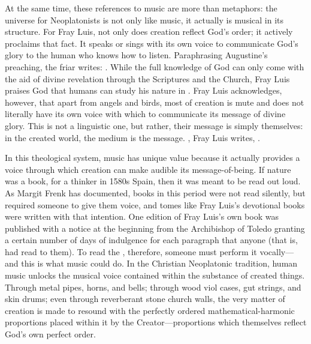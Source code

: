At the same time, these references to music are more than metaphors: the
universe for Neoplatonists is not only like music, it actually is musical in
its structure.
For Fray Luis, not only does creation reflect God's order; it actively
proclaims that fact.
It speaks or sings with its own voice to communicate God's glory to the human
who knows how to listen.
Paraphrasing Augustine's preaching, the friar writes: .%
    \Autocite[185, glossing Augustine's commentary on ]
    {LuisdeGranada:Simbolo} 
While the full knowledge of God can only come with the aid of divine revelation
through the Scriptures and the Church, Fray Luis praises God that humans can
study his nature in .%
    \Autocite[186]{LuisdeGranada:Simbolo}
Fray Luis acknowledges, however, that apart from angels and birds, most of
creation is mute and does not literally have its own voice with which to
communicate its message of divine glory.
This  is not a linguistic one, but rather, their message is
simply themselves: in the created world, the medium is the message.
, Fray Luis writes, .%
    \Autocite[192]{LuisdeGranada:Simbolo}

In this theological system, music has unique value because it actually provides
a voice through which creation can make audible its message-of-being.
If nature was a book, for a thinker in 1580s Spain, then it was meant to be
read out loud.
As Margit Frenk has documented, books in this period were not read silently,
but required someone to give them voice, and tomes like Fray Luis's devotional
books were written with that intention.%
    \Autocite{Frenk:Voz}
One edition of Fray Luis's own book  was published
with a notice at the beginning from the Archibishop of Toledo granting a
certain number of days of indulgence for each paragraph that anyone
 (that is, had read to them).%
    \citXXX[signature]
To read the , therefore, someone must perform it
vocally---and this is what music could do.
In the Christian Neoplatonic tradition, human music unlocks the musical voice
contained within the substance of created things.
Through metal pipes, horns, and bells; through wood viol cases, gut strings,
and skin drums; even through reverberant stone church walls, the very matter of
creation is made to resound with the perfectly ordered mathematical-harmonic
proportions placed within it by the Creator---proportions which themselves
reflect God's own perfect order.

